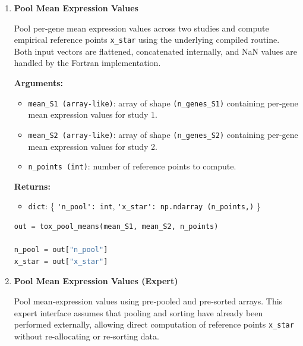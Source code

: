 \begin{enumerate}
        \begin{lstlisting}[language=Python, caption={Signed Residual Computation}]
resid = tox_compute_residuals(expr, means)
        \end{lstlisting}


    \item \textbf{Pool Mean Expression Values}

        Pool per‑gene mean expression values across two studies and compute empirical reference points \lstinline!x_star! using the underlying compiled routine.  
        Both input vectors are flattened, concatenated internally, and NaN values are handled by the Fortran implementation.

        \textbf{Arguments:}
        \begin{itemize}
            \item \lstinline!mean_S1 (array-like)!: array of shape \lstinline!(n_genes_S1)! containing per‑gene mean expression values for study 1.
            \item \lstinline!mean_S2 (array-like)!: array of shape \lstinline!(n_genes_S2)! containing per‑gene mean expression values for study 2.
            \item \lstinline!n_points (int)!: number of reference points to compute.
        \end{itemize}

        \textbf{Returns:}
        \begin{itemize}
            \item \lstinline!dict!: \{
                \lstinline!'n_pool': int!,  
                \lstinline!'x_star': np.ndarray (n_points,)!
            \}
        \end{itemize}

        \begin{lstlisting}[language=Python, caption={Pooling Mean Expression Values}]
out = tox_pool_means(mean_S1, mean_S2, n_points)

n_pool = out["n_pool"]
x_star = out["x_star"]
        \end{lstlisting}

    \item \textbf{Pool Mean Expression Values (Expert)}

        Pool mean‑expression values using pre‑pooled and pre‑sorted arrays.  
        This expert interface assumes that pooling and sorting have already been performed externally, allowing direct computation of reference points \lstinline!x_star! without re‑allocating or re‑sorting data.


\end{enumerate}
